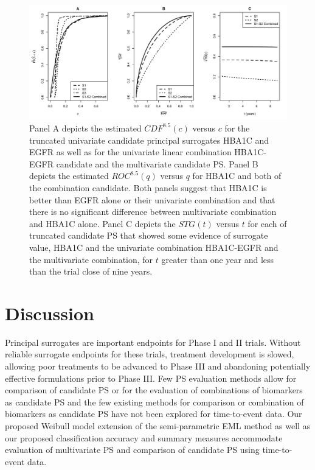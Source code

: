 \documentclass[times, doublespace]{simauth}
\begin{document}
\begin{figure}
\begin{center}
\includegraphics[width=.9\textwidth]{dcct-example-figure-2014-7-16.pdf}
\end{center}
\caption{Panel A depicts the estimated $CDF^{8.5}(c)$ versus $c$ for the truncated univariate candidate principal surrogates HBA1C and EGFR as well as for the univariate linear combination HBA1C-EGFR candidate and the multivariate candidate PS. Panel B depicts the estimated $ROC^{8.5}(q)$ versus $q$ for HBA1C and both of the combination candidate. Both panels suggest that HBA1C is better than EGFR alone or their univariate combination and that there is no significant difference between multivariate combination and HBA1C alone. Panel C depicts the $STG(t)$ versus $t$ for each of truncated candidate PS that showed some evidence of surrogate value, HBA1C and the univariate combination HBA1C-EGFR and the multivariate combination, for $t$ greater than one year and less than the trial close of nine years. \label{exp}}
\end{figure}

\section{Discussion}
Principal surrogates are important endpoints for Phase I and II trials. Without reliable surrogate endpoints for these trials, treatment development is slowed, allowing poor treatments to be advanced to Phase III and abandoning potentially effective formulations prior to Phase III. Few PS evaluation methods allow for comparison of candidate PS or for the evaluation of combinations of biomarkers as candidate PS and the few existing methods for comparison or combination of biomarkers as candidate PS have not been explored for time-to-event data. Our proposed Weibull model extension of the \citet{Huang11} semi-parametric EML method as well as our proposed classification accuracy and summary measures accommodate evaluation of multivariate PS and comparison of candidate PS using time-to-event data. 
\end{document}
